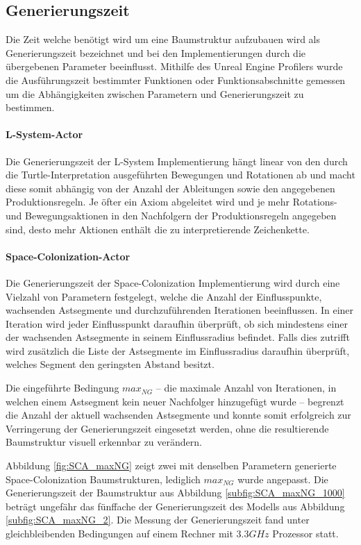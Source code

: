 \subsection{Generierungszeit}

Die Zeit welche benötigt wird um eine Baumstruktur aufzubauen wird als Generierungszeit bezeichnet und bei den Implementierungen durch die übergebenen Parameter beeinflusst. Mithilfe des Unreal Engine Profilers wurde die Ausführungszeit bestimmter Funktionen oder Funktionsabschnitte gemessen um die Abhängigkeiten zwischen Parametern und Generierungszeit zu bestimmen. \cite{Profiling:15}

\paragraph{L-System-Actor}

Die Generierungszeit der L-System Implementierung hängt linear von den durch die Turtle-Interpretation ausgeführten Bewegungen und Rotationen ab und macht diese somit abhängig von der Anzahl der Ableitungen sowie den angegebenen Produktionsregeln. Je öfter ein Axiom abgeleitet wird und je mehr Rotations- und Bewegungsaktionen in den Nachfolgern der Produktionsregeln angegeben sind, desto mehr Aktionen enthält die zu interpretierende Zeichenkette. 

\paragraph{Space-Colonization-Actor}

Die Generierungszeit der Space-Colonization Implementierung wird durch eine Vielzahl von Parametern festgelegt, welche die Anzahl der Einflusspunkte, wachsenden Astsegmente und durchzuführenden Iterationen beeinflussen. In einer Iteration wird jeder Einflusspunkt daraufhin überprüft, ob sich mindestens einer der wachsenden Astsegmente in seinem Einflussradius befindet. Falls dies zutrifft wird zusätzlich die Liste der Astsegmente im Einflussradius daraufhin überprüft, welches Segment den geringsten Abstand besitzt.

Die eingeführte Bedingung $max_{NG}$ -- die maximale Anzahl von Iterationen, in welchen einem Astsegment kein neuer Nachfolger hinzugefügt wurde -- begrenzt die Anzahl der aktuell wachsenden Astsegmente und konnte somit erfolgreich zur Verringerung der Generierungszeit eingesetzt werden, ohne die resultierende Baumstruktur visuell erkennbar zu verändern. 

Abbildung \ref{fig:SCA_maxNG} zeigt zwei mit denselben Parametern generierte Space-Colo\-ni\-za\-tion Baumstrukturen, lediglich $max_{NG}$ wurde angepasst. Die Generierungszeit der Baumstruktur aus Abbildung \ref{subfig:SCA_maxNG_1000} beträgt ungefähr das fünffache der Generierungszeit des Modells aus Abbildung \ref{subfig:SCA_maxNG_2}. Die Messung der Generierungszeit fand unter gleichbleibenden Bedingungen auf einem Rechner mit $3.3GHz$ Prozessor statt. 

